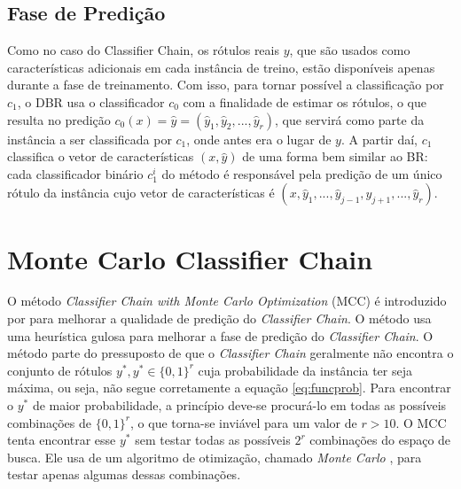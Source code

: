   \subsection{Fase de Predição}
  Como no caso do Classifier Chain, os rótulos reais $y$, que são usados como características adicionais em cada instância de treino,
 estão disponíveis apenas durante a fase de treinamento.
 Com isso, para tornar possível a classificação por $c_1$, o DBR usa o classificador $c_0$ com a finalidade de
 estimar os rótulos, %
 o que resulta no predição $c_0(x)=\hat{y}=(\hat{y}_1,\hat{y}_2,...,\hat{y}_r)$, 
 que servirá como parte da instância a ser classificada por $c_1$,
 onde antes era o lugar de $y$. 
 A partir daí, $c_1$ classifica o vetor de características $(x,\hat{y})$ de uma forma bem similar ao BR:
 cada classificador binário $c_1^i$ do método é responsável pela predição de um único rótulo da instância
 cujo vetor de características é $(x,\hat{y}_1,...,\hat{y}_{j-1},\hat{y}_{j+1},...,\hat{y}_r)$.

\section{Monte Carlo Classifier Chain}


O método \textit{Classifier Chain with Monte Carlo Optimization} (MCC) é introduzido
por \cite{mcc2012} para melhorar a qualidade de predição do \textit{Classifier Chain}.
O método usa uma heurística gulosa para melhorar a fase de predição do \textit{Classifier Chain}.
O método parte do pressuposto de que o \textit{Classifier Chain} geralmente não encontra
o conjunto de rótulos $y^*,y^* \in {\{0,1\}}^r$ cuja probabilidade da instância ter seja máxima, ou seja, 
não segue corretamente a equação \ref{eq:funcprob}.
Para encontrar o $y^*$ de maior probabilidade, a princípio deve-se procurá-lo em todas as possíveis
combinações de ${\{0,1\}}^r$, o que torna-se inviável para um valor de $r>10$.
O MCC tenta encontrar esse $y^*$ sem testar todas as possíveis $2^r$ combinações do espaço de busca.
Ele usa de um algoritmo de otimização, chamado \textit{Monte Carlo} \cite{montecarlo}, para
testar apenas algumas dessas combinações.



 

